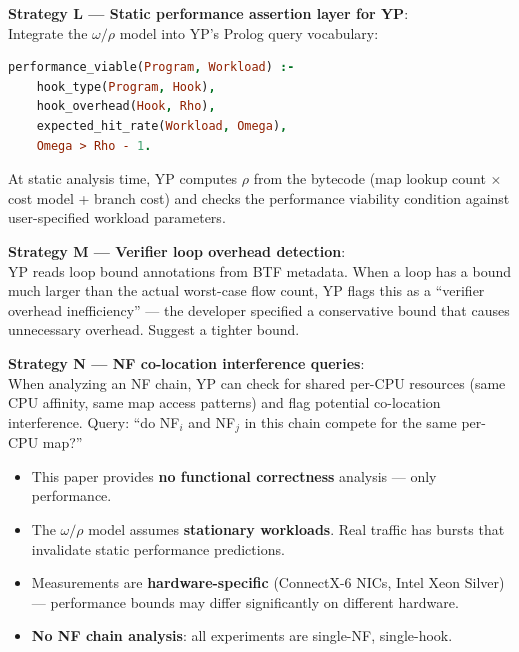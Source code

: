 \begin{strategybox}
\textbf{Strategy L --- Static performance assertion layer for YP}:\\
Integrate the $\omega/\rho$ model into YP's Prolog query vocabulary:
\begin{lstlisting}[language=Prolog]
% New YP Prolog query:
performance_viable(Program, Workload) :-
    hook_type(Program, Hook),
    hook_overhead(Hook, Rho),
    expected_hit_rate(Workload, Omega),
    Omega > Rho - 1.
\end{lstlisting}
At static analysis time, YP computes $\rho$ from the bytecode (map lookup count $\times$ cost model + branch cost) and checks the performance viability condition against user-specified workload parameters.

\textbf{Strategy M --- Verifier loop overhead detection}:\\
YP reads loop bound annotations from BTF metadata. When a loop has a bound much larger than the actual worst-case flow count, YP flags this as a ``verifier overhead inefficiency'' --- the developer specified a conservative bound that causes unnecessary overhead. Suggest a tighter bound.

\textbf{Strategy N --- NF co-location interference queries}:\\
When analyzing an NF chain, YP can check for shared per-CPU resources (same CPU affinity, same map access patterns) and flag potential co-location interference. Query: ``do NF$_i$ and NF$_j$ in this chain compete for the same per-CPU map?''
\end{strategybox}

\begin{limitbox}
\begin{itemize}
  \item This paper provides \textbf{no functional correctness} analysis --- only performance.
  \item The $\omega/\rho$ model assumes \textbf{stationary workloads}. Real traffic has bursts that invalidate static performance predictions.
  \item Measurements are \textbf{hardware-specific} (ConnectX-6 NICs, Intel Xeon Silver) --- performance bounds may differ significantly on different hardware.
  \item \textbf{No NF chain analysis}: all experiments are single-NF, single-hook.
\end{itemize}
\end{limitbox}

